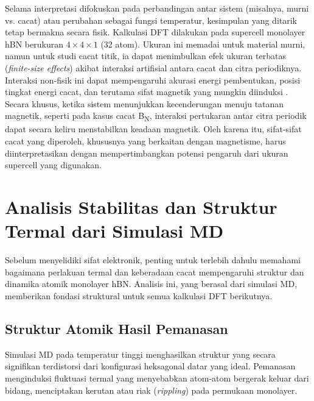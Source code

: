 Selama interpretasi difokuskan pada perbandingan antar sistem (misalnya, murni vs. cacat) atau perubahan sebagai fungsi temperatur, kesimpulan yang ditarik tetap bermakna secara fisik.
Kalkulasi DFT dilakukan pada supercell monolayer hBN berukuran $4 \times 4 \times 1$ (32 atom).
Ukuran ini memadai untuk material murni, namun untuk studi cacat titik, ia dapat menimbulkan efek ukuran terbatas (\emph{finite-size effects}) akibat interaksi artifisial antara cacat dan citra periodiknya.
Interaksi non-fisik ini dapat mempengaruhi akurasi energi pembentukan, posisi tingkat energi cacat, dan terutama sifat magnetik yang mungkin diinduksi \citep{Freysoldt2014}.
Secara khusus, ketika sistem menunjukkan kecenderungan menuju tatanan magnetik, seperti pada kasus cacat B\textsubscript{N}, interaksi pertukaran antar citra periodik dapat secara keliru menstabilkan keadaan magnetik.
Oleh karena itu, sifat-sifat cacat yang diperoleh, khususnya yang berkaitan dengan magnetisme, harus diinterpretasikan dengan mempertimbangkan potensi pengaruh dari ukuran supercell yang digunakan.

\section{Analisis Stabilitas dan Struktur Termal dari Simulasi MD}
\label{sec:analisis_md}
Sebelum menyelidiki sifat elektronik, penting untuk terlebih dahulu memahami bagaimana perlakuan termal dan keberadaan cacat mempengaruhi struktur dan dinamika atomik monolayer hBN.
Analisis ini, yang berasal dari simulasi MD, memberikan fondasi struktural untuk semua kalkulasi DFT berikutnya.
\subsection{Struktur Atomik Hasil Pemanasan}
\label{subsec:md_struktur}
Simulasi MD pada temperatur tinggi menghasilkan struktur yang secara signifikan terdistorsi dari konfigurasi heksagonal datar yang ideal.
Pemanasan menginduksi fluktuasi termal yang menyebabkan atom-atom bergerak keluar dari bidang, menciptakan kerutan atau riak (\emph{rippling}) pada permukaan monolayer.

